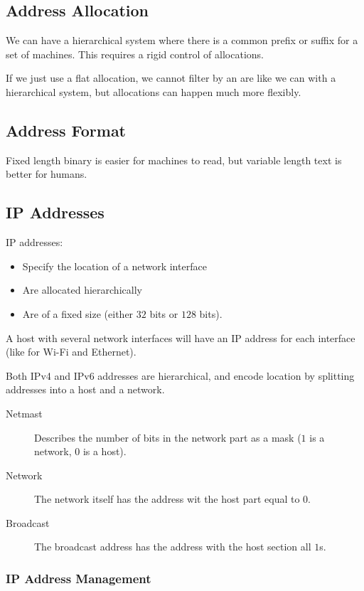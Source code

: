 \subsection{Address Allocation}\label{sub:address_allocation}

We can have a hierarchical system where there is a common prefix or suffix for a set of machines.
This requires a rigid control of allocations.

If we just use a flat allocation, we cannot filter by an are like we can with a hierarchical system, but allocations can happen much more flexibly.

\subsection{Address Format}\label{sub:address_format}

Fixed length binary is easier for machines to read, but variable length text is better for humans.

\subsection{IP Addresses}\label{sub:ip_addresses}

IP addresses:
\begin{itemize}
	\item Specify the location of a network interface
	\item Are allocated hierarchically
	\item Are of a fixed size (either \(32\) bits or \(128\) bits).
\end{itemize}

A host with several network interfaces will have an IP address for each interface (like for Wi-Fi and Ethernet).

Both IPv4 and IPv6 addresses are hierarchical, and encode location by splitting addresses into a host and a network.
\begin{description}
	\item[Netmast] Describes the number of bits in the network part as a mask (\(1\) is a network,  \(0\) is a host).
	\item[Network] The network itself has the address wit the host part equal to \(0\).
	\item[Broadcast] The broadcast address has the address with the host section all \(1\)s.
\end{description}

\subsubsection{IP Address Management}\label{ssub:ip_address_management}

